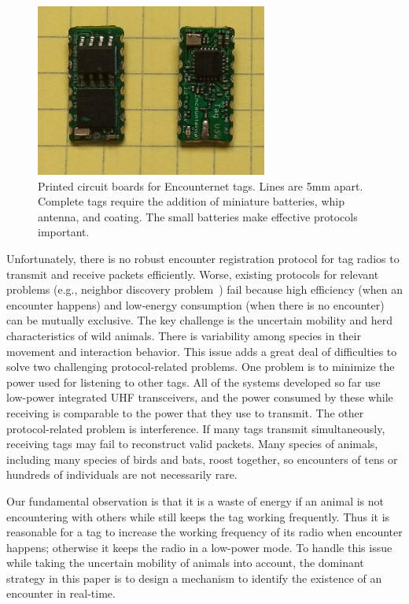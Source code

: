 \begin{figure}[!t]
    \centering
    \includegraphics[width=3in]{figures/tag}
    \caption{Printed circuit boards for Encounternet tags.%
    Lines are 5mm apart. Complete tags require the addition of miniature batteries, whip antenna, and
    coating. The small batteries make effective protocols important.}
    \label{tags}
\end{figure}

Unfortunately, there is no robust encounter registration protocol 
for tag radios to transmit and receive packets efficiently.
Worse, existing protocols for relevant problems (e.g., neighbor discovery problem~\cite{Bakht2012Searchlight}) 
fail because high efficiency (when an encounter happens)
and low-energy consumption (when there is no encounter) 
can be mutually exclusive.
The key challenge is the uncertain mobility and herd characteristics of wild 
animals. There is variability among species in their movement and 
interaction behavior. 
This issue adds a great deal of difficulties to
solve two challenging protocol-related problems. 
One problem is to minimize the power used for listening to other tags. 
All of the systems developed so far use low-power integrated
UHF transceivers, and the power consumed by these while receiving is 
comparable to the power that they use to transmit. 
The other protocol-related problem is interference. 
If many tags transmit simultaneously, receiving tags may fail
to reconstruct valid packets. 
Many species of animals, including many species of
birds and bats, roost together, so encounters of tens or hundreds 
of individuals are not necessarily rare.

Our fundamental observation is that it is a waste of 
energy if an animal is not encountering with others
while still keeps the tag working frequently.
Thus it is reasonable for a tag to
increase the working frequency of its radio when 
encounter happens; otherwise it keeps
the radio in a low-power mode. 
To handle this issue while taking the uncertain mobility of animals into account, 
the dominant strategy in this paper is to design a mechanism
to identify the existence of an encounter in real-time. 

